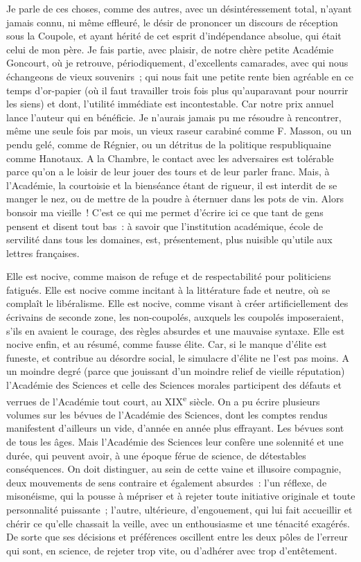 \documentclass[french,twoside]{book} %
\begin{document}
Je parle de ces choses, comme des autres, avec un désintéressement total, n’ayant jamais connu, ni même effleuré, le désir de prononcer un discours de réception sous la Coupole, et ayant hérité de cet esprit d’indépendance absolue, qui était celui de mon père. Je fais partie, avec plaisir, de notre chère petite Académie Goncourt, où je retrouve, périodiquement, d’excellents camarades, avec qui nous échangeons de vieux souvenirs ; qui nous fait une petite rente bien agréable en ce temps d’or-papier (où il faut travailler trois fois plus qu’auparavant pour nourrir les siens) et dont, l’utilité immédiate est incontestable. Car notre prix annuel lance l’auteur qui en bénéficie. Je n’aurais jamais pu me résoudre à rencontrer, même une seule fois par mois, un vieux raseur carabiné comme F. Masson, ou un pendu gelé, comme de Régnier, ou un détritus de la politique respubliquaine comme Hanotaux. A la Chambre, le contact avec les adversaires est tolérable parce qu’on a le loisir de leur jouer des tours et de leur parler franc. Mais, à l’Académie, la courtoisie et la bienséance étant de rigueur, il est interdit de se manger le nez, ou de mettre de la poudre à éternuer dans les pots de vin. Alors bonsoir ma vieille ! C’est ce qui me permet d’écrire ici ce que tant de gens pensent et disent tout bas : à savoir que l’institution académique, école de servilité dans tous les domaines, est, présentement, plus nuisible qu’utile aux lettres françaises.\par
Elle est nocive, comme maison de refuge et de respectabilité pour politiciens fatigués. Elle est nocive comme incitant à la littérature fade et neutre, où se complaît le libéralisme. Elle est nocive, comme visant à créer artificiellement des écrivains de seconde zone, les non-coupolés, auxquels les coupolés imposeraient, s’ils en avaient le courage, des règles absurdes et une mauvaise syntaxe. Elle est nocive enfin, et au résumé, comme fausse élite. Car, si le manque d’élite est funeste, et contribue au désordre social, le simulacre d’élite ne l’est pas moins. A un moindre degré (parce que jouissant d’un moindre relief de vieille réputation) l’Académie des Sciences et celle des Sciences morales participent des défauts et verrues de l’Académie tout court, au XIX\textsuperscript{e} siècle. On a pu écrire plusieurs volumes sur les bévues de l’Académie des Sciences, dont les comptes rendus manifestent d’ailleurs un vide, d’année en année plus effrayant. Les bévues sont de tous les âges. Mais l’Académie des Sciences leur confère une solennité et une durée, qui peuvent avoir, à une époque férue de science, de détestables conséquences. On doit distinguer, au sein de cette vaine et illusoire compagnie, deux mouvements de sens contraire et également absurdes : l’un réflexe, de misonéisme, qui la pousse à mépriser et à rejeter toute initiative originale et toute personnalité puissante ; l’autre, ultérieure, d’engouement, qui lui fait accueillir et chérir ce qu’elle chassait la veille, avec un enthousiasme et une ténacité exagérés. De sorte que ses décisions et préférences oscillent entre les deux pôles de l’erreur qui sont, en science, de rejeter trop vite, ou d’adhérer avec trop d’entêtement.\par
\end{document}
